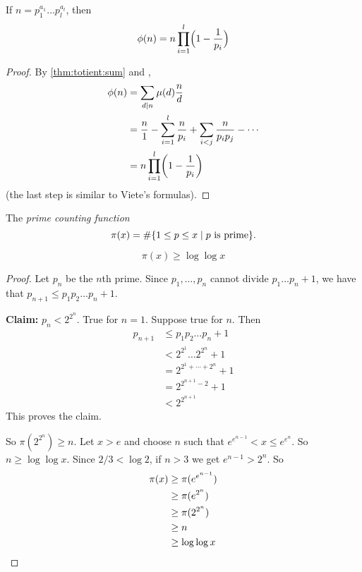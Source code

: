 \begin{proposition*}
    If $n = p_1^{a_1} \dots p_l^{a_l}$, then \[
        \phi(n) = n \prod_{i=1}^l \paren*[\Big]{1 - \frac{1}{p_i}}
    \]
\end{proposition*}
\begin{proof}
    By \cref{thm:totient:sum} and ,
    \begin{align*}
        \phi(n) &= \sum_{d \mid n} \mu(d) \frac{n}{d} \\
             &= \frac{n}{1} - \sum_{i=1}^l \frac{n}{p_i}
                + \sum_{i < j} \frac{n}{p_i p_j} - \cdots \\
             &= n \prod_{i=1}^l \paren*[\bigg]{1 - \frac{1}{p_i}}
    \end{align*} (the last step is similar to Viete's formulas).
\end{proof}

\begin{definition*} \label{def:nt:pi}
    The \emph{prime counting function} \[
        \pi(x) = \#\set{1 \le p \le x \mid p \text{ is prime}}.
    \]
\end{definition*}
\begin{proposition*} \label{thm:nt:pi:loglog}
    \[
        \pi(x) \ge \log \log x
    \]
\end{proposition*}
\begin{proof}
    Let $p_n$ be the $n$th prime.
    Since $p_1, \dots, p_n$ cannot divide $p_1 \dots p_n + 1$,
    we have that $p_{n+1} \le p_1 p_2 \dots p_n + 1$.

    \textbf{Claim:} $p_n < 2^{2^n}$.
    True for $n = 1$.
    Suppose true for $n$.
    Then \begin{align*}
        p_{n+1} &\le p_1 p_2 \dots p_n + 1 \\
             &< 2^{2^1} \dots 2^{2^n} + 1 \\
             &= 2^{2^1 + \cdots + 2^n} + 1 \\
             &= 2^{2^{n+1} - 2} + 1 \\
             &< 2^{2^{n+1}}
    \end{align*}
    This proves the claim.

    So $\pi(2^{2^n}) \ge n$.
    Let $x > e$ and choose $n$ such that $e^{e^{n-1}} < x \le e^{e^n}$.
    So $n \ge \log \log x$.
    Since $2/3 < \log 2$, if $n > 3$ we get $e^{n-1} > 2^n$.
    So \begin{align*}
        \pi(x) &\ge \pi(e^{e^{n-1}}) \\
             &\ge \pi(e^{2^n}) \\
             &\ge \pi(2^{2^n}) \\
             &\ge n \\
             &\ge \log \log x \qedhere
    \end{align*}
\end{proof}


